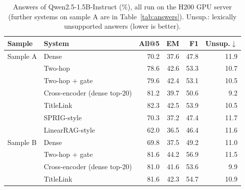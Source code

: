 \begin{table}[t]
\centering
\footnotesize
\caption{Answers of Qwen2.5-1.5B-Instruct (\%), all run on the H200 GPU server (further systems on sample A are in Table~\ref{tab:answers}). Unsup.: lexically unsupported answers (lower is better).}
\label{tab:gpuanswers}
\begin{tabular}{llrrrr}
\toprule
Sample & System & All@5 & EM & F1 & Unsup.$\downarrow$ \\
\midrule
Sample A & Dense & 70.2 & 37.6 & 47.8 & 11.9 \\
 & Two-hop & 78.6 & 42.6 & 53.3 & 10.7 \\
 & Two-hop + gate & 79.6 & 42.4 & 53.1 & 10.5 \\
 & Cross-encoder (dense top-20) & 81.2 & 39.7 & 50.6 & 9.2 \\
 & TitleLink & 82.3 & 42.5 & 53.9 & 10.5 \\
 & SPRIG-style & 70.3 & 37.2 & 47.4 & 11.7 \\
 & LinearRAG-style & 62.0 & 36.5 & 46.4 & 11.6 \\
\midrule
Sample B & Dense & 69.8 & 37.5 & 49.2 & 11.0 \\
 & Two-hop + gate & 81.6 & 44.2 & 56.9 & 11.5 \\
 & Cross-encoder (dense top-20) & 81.0 & 41.6 & 53.6 & 9.9 \\
 & TitleLink & 81.6 & 42.3 & 54.7 & 10.9 \\
\bottomrule
\end{tabular}
\end{table}
